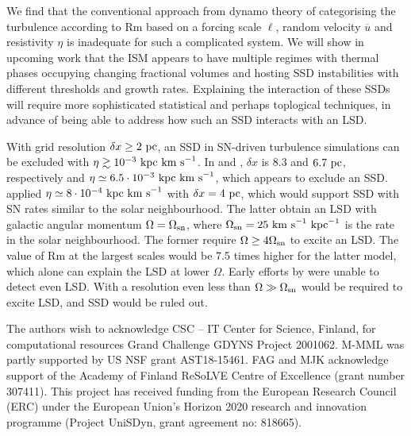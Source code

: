 \documentclass[preprint2]{aastex63}
\newcommand\OSN{\Omega_{\rm sn}}
\newcommand\kpc{~ {\rm kpc}}
\newcommand\pc{~ {\rm pc}}
\newcommand\dx{ {\delta x}}
\newcommand\kms{~ {\rm km~ s}^{-1}}
\begin{document}
We find that the conventional approach from dynamo theory of categorising the 
turbulence according to Rm based on a forcing scale $\ell$, random
velocity $\overline{u}$ and
resistivity $\eta$ is inadequate for such a complicated system.
    We will show in upcoming work that the
ISM appears to have multiple regimes
     with thermal phases 
occupying changing fractional volumes
       \citep[e.g.][]{gatto2015} and hosting
SSD instabilities with different thresholds and growth rates.
Explaining the interaction of these SSDs will require more sophisticated
statistical and perhaps toplogical techniques, in advance of being able to 
address how such an SSD interacts with an LSD.

With grid resolution $\dx\geq2\pc$, an SSD in SN-driven turbulence simulations can be
excluded with $\eta\gtrsim10^{-3}\kpc\kms$.
In \citet{Gressel:2008} and \citet{GE20}, $\dx$ is 8.3 and $6.7\pc$, respectively
and $\eta\simeq6.5\cdot10^{-3}\kpc\kms$, which
     appears to exclude an
SSD.  \citet{Gent:2013b} applied $\eta\simeq8\cdot10^{-4}\kpc\kms$ with $\dx=4\pc$,
which would support SSD with SN rates similar to the solar neighbourhood.
The latter obtain an LSD with galactic angular momentum $\Omega=\OSN$, where
$\OSN=25\kms\kpc^{-1}$ is the rate in the solar neighbourhood.
The former require $\Omega\geq4\OSN$ to excite an LSD. The value of
Rm at the largest scales would be 7.5 times higher for the latter 
model, which alone can explain the LSD at lower $\Omega$.
Early efforts by \citet{Korpi:1999b} were unable to detect even LSD.
With a resolution even less than \citet{Gressel:2008} $\Omega\gg\OSN$ would be 
required to excite LSD, and SSD would be ruled out.

\acknowledgments
The authors wish to acknowledge CSC – IT Center for Science, Finland, for
computational resources Grand Challenge GDYNS Project 2001062.
M-MML was partly supported by US NSF grant AST18-15461.
FAG and MJK acknowledge support of the Academy of Finland
ReSoLVE Centre of Excellence (grant number 307411).
This project has received funding from the European Research Council (ERC)
under the European Union's Horizon 2020 research and innovation
programme (Project UniSDyn, grant agreement no: 818665).

{}

\end{document}
